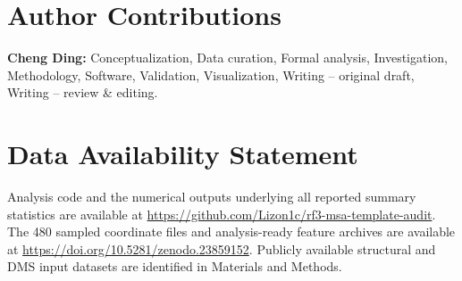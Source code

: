 \documentclass[10pt,a4paper]{article}
\begin{document}
\section*{Author Contributions}
\textbf{Cheng Ding:} Conceptualization, Data curation, Formal analysis, Investigation, Methodology, Software, Validation, Visualization, Writing -- original draft, Writing -- review \& editing.

\section*{Data Availability Statement}
Analysis code and the numerical outputs underlying all reported summary statistics are available at \url{https://github.com/Lizon1c/rf3-msa-template-audit}. The 480 sampled coordinate files and analysis-ready feature archives are available at \url{https://doi.org/10.5281/zenodo.23859152}. Publicly available structural and DMS input datasets are identified in Materials and Methods.
\end{document}
